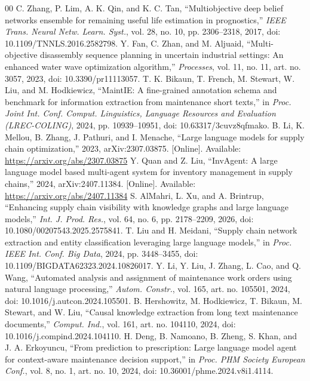 \documentclass[a4paper,conference]{IEEEtran}
\begin{document}
\begin{thebibliography}{00}
 C. Zhang, P. Lim, A. K. Qin, and K. C. Tan, ``Multiobjective deep belief networks ensemble for remaining useful life estimation in prognostics,'' \emph{IEEE Trans. Neural Netw. Learn. Syst.}, vol. 28, no. 10, pp. 2306--2318, 2017, doi: 10.1109/TNNLS.2016.2582798.
 Y. Fan, C. Zhan, and M. Aljuaid, ``Multi-objective disassembly sequence planning in uncertain industrial settings: An enhanced water wave optimization algorithm,'' \emph{Processes}, vol. 11, no. 11, art. no. 3057, 2023, doi: 10.3390/pr11113057.
 T. K. Bikaun, T. French, M. Stewart, W. Liu, and M. Hodkiewicz, ``MaintIE: A fine-grained annotation schema and benchmark for information extraction from maintenance short texts,'' in \emph{Proc. Joint Int. Conf. Comput. Linguistics, Language Resources and Evaluation (LREC-COLING)}, 2024, pp. 10939--10951, doi: 10.63317/3cuvz8qfmako.
 B. Li, K. Mellou, B. Zhang, J. Pathuri, and I. Menache, ``Large language models for supply chain optimization,'' 2023, arXiv:2307.03875. [Online]. Available: \url{https://arxiv.org/abs/2307.03875}
 Y. Quan and Z. Liu, ``InvAgent: A large language model based multi-agent system for inventory management in supply chains,'' 2024, arXiv:2407.11384. [Online]. Available: \url{https://arxiv.org/abs/2407.11384}
 S. AlMahri, L. Xu, and A. Brintrup, ``Enhancing supply chain visibility with knowledge graphs and large language models,'' \emph{Int. J. Prod. Res.}, vol. 64, no. 6, pp. 2178--2209, 2026, doi: 10.1080/00207543.2025.2575841.
 T. Liu and H. Meidani, ``Supply chain network extraction and entity classification leveraging large language models,'' in \emph{Proc. IEEE Int. Conf. Big Data}, 2024, pp. 3448--3455, doi: 10.1109/BIGDATA62323.2024.10826017.
 Y. Li, Y. Liu, J. Zhang, L. Cao, and Q. Wang, ``Automated analysis and assignment of maintenance work orders using natural language processing,'' \emph{Autom. Constr.}, vol. 165, art. no. 105501, 2024, doi: 10.1016/j.autcon.2024.105501.
 B. Hershowitz, M. Hodkiewicz, T. Bikaun, M. Stewart, and W. Liu, ``Causal knowledge extraction from long text maintenance documents,'' \emph{Comput. Ind.}, vol. 161, art. no. 104110, 2024, doi: 10.1016/j.compind.2024.104110.
 H. Deng, B. Namoano, B. Zheng, S. Khan, and J. A. Erkoyuncu, ``From prediction to prescription: Large language model agent for context-aware maintenance decision support,'' in \emph{Proc. PHM Society European Conf.}, vol. 8, no. 1, art. no. 10, 2024, doi: 10.36001/phme.2024.v8i1.4114.

\end{thebibliography}
\end{document}
